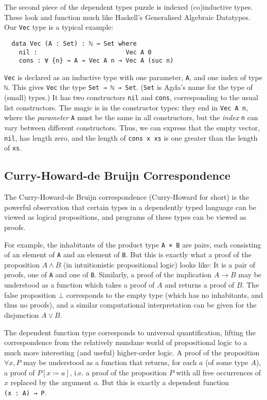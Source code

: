 \documentclass{scrartcl}
\newcommand*{\cod}[1]{\texttt{#1}}
\begin{document}
The second piece of the dependent types puzzle is indexed (co)inductive types.
These look and function much like Haskell's Generalised Algebraic Datatypes. Our
\cod{Vec} type is a typical example:
\begin{verbatim}
  data Vec (A : Set) : ℕ → Set where
    nil :                        Vec A 0
    cons : ∀ {n} → A → Vec A n → Vec A (suc n)
\end{verbatim}
\cod{Vec} is declared as an inductive type with one parameter, \cod{A}, and one
index of type \cod{ℕ}. This gives \cod{Vec} the type \cod{Set → ℕ → Set}.
(\cod{Set} is Agda's name for the type of (small) types.) It has two
constructors \cod{nil} and \cod{cons}, corresponding to the usual list
constructors. The magic is in the constructor types: they end in \cod{Vec A n},
where the \emph{parameter} \cod{A} must be the same in all constructors, but the
\emph{index} \cod{n} can vary between different constructors. Thus, we can
express that the empty vector, \cod{nil}, has length zero, and the length of
\cod{cons x xs} is one greater than the length of \cod{xs}.


\subsection{Curry-Howard-de Bruijn Correspondence}

The Curry-Howard-de Bruijn correspondence (Curry-Howard for short) is the
powerful observation that certain types in a dependently typed language can be
viewed as logical propositions, and programs of these types can be viewed as
proofs.

For example, the inhabitants of the product type \cod{A × B} are pairs, each
consisting of an element of \cod{A} and an element of \cod{B}. But this is
exactly what a proof of the proposition $A ∧ B$ (in intuitionistic propositional
logic) looks like: It is a pair of proofs, one of \cod{A} and one of \cod{B}.
Similarly, a proof of the implication $A → B$ may be understood as a function
which takes a proof of $A$ and returns a proof of $B$. The false proposition
$⊥$ corresponds to the empty type (which has no inhabitants, and thus no
proofs), and a similar computational interpretation can be given for the
disjunction $A ∨ B$.

The dependent function type corresponds to universal quantification, lifting the
correspondence from the relatively mundane world of propositional logic to a
much more interesting (and useful) higher-order logic. A proof of the
proposition $∀x, P$ may be understood as a function that returns, for each $a$
(of some type $A$), a proof of $P[x ≔ a]$, i.e. a proof of the proposition $P$
with all free occurrences of $x$ replaced by the argument $a$. But this is
exactly a dependent function \cod{(x~:~A)~→~P}.
\end{document}
